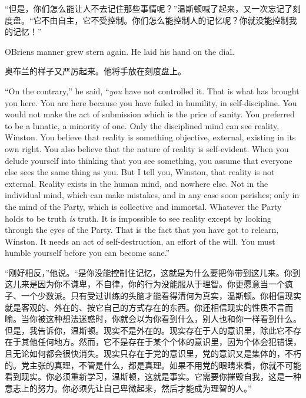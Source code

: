 \begin{paracol}{2}
\switchcolumn

``但是，你们怎么能让人不去记住那些事情呢？''温斯顿喊了起来，又一次忘记了刻度盘。``它不由自主，它不受控制。你们怎么能控制人的记忆呢？你就没能控制我的记忆！''

\switchcolumn*

O\textquotesingle Brien\textquotesingle s manner grew stern again. He
laid his hand on the dial.

\switchcolumn

奥布兰的样子又严厉起来。他将手放在刻度盘上。

\switchcolumn*

``On the contrary,'' he said, ``\emph{you} have not controlled it. That is
what has brought you here. You are here because you have failed in
humility, in self-discipline. You would not make the act of submission
which is the price of sanity. You preferred to be a lunatic, a minority
of one. Only the disciplined mind can see reality, Winston. You believe
that reality is something objective, external, existing in its own
right. You also believe that the nature of reality is self-evident. When
you delude yourself into thinking that you see something, you assume
that everyone else sees the same thing as you. But I tell you, Winston,
that reality is not external. Reality exists in the human mind, and
nowhere else. Not in the individual mind, which can make mistakes, and
in any case soon perishes; only in the mind of the Party, which is
collective and immortal. Whatever the Party holds to be truth \emph{is}
truth. It is impossible to see reality except by looking through the
eyes of the Party. That is the fact that you have got to relearn,
Winston. It needs an act of self-destruction, an effort of the will. You
must humble yourself before you can become sane.''

\switchcolumn

``刚好相反，''他说。``是你没能控制住记忆，这就是为什么要把你带到这儿来。你到这儿来是因为你不谦卑，不自律，你的行为没能服从于理智。你更愿意当一个疯子、一个少数派。只有受过训练的头脑才能看得清何为真实，温斯顿。你相信现实就是客观的、外在的、按它自己的方式存在的东西。你还相信现实的性质不言而喻。当你被这种想法迷惑时，你就会以为你看到什么，别人也和你一样看到什么。但是，我告诉你，温斯顿。现实不是外在的。现实存在于人的意识里，除此它不存在于其他任何地方。然而，它不是存在于某个个体的意识里，因为个体会犯错误，且无论如何都会很快消失。现实只存在于党的意识里，党的意识又是集体的，不朽的。党主张的真理，不管是什么，都是真理。如果不用党的眼睛来看，你就不可能看到现实。你必须重新学习，温斯顿，这就是事实。它需要你摧毁自我，这是一种意志上的努力。你必须先让自己卑微起来，然后才能成为理智的人。''


\end{paracol}
